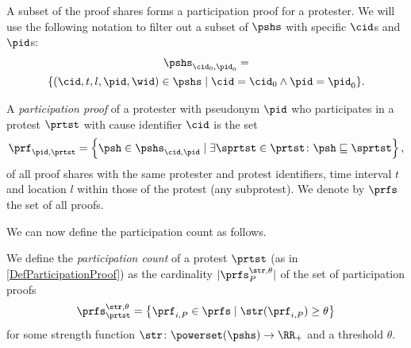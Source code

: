 A subset of the proof shares forms a participation proof for a protester.
We will use the following notation to filter out a subset of \(\pshs\) with specific \(\cid\)s and \(\pid\)s:
\begin{multline*}
  \pshs_{\cid_0, \pid_0} = \\
  \{(\cid, t, l, \pid, \wid)\in \pshs\mid \cid = \cid_0 \land \pid = \pid_0\}.
\end{multline*}

\begin{definition}%
  \label{DefParticipationProof}\label{DefParticipationProofs}
  A \emph{participation proof} of a protester with pseudonym \(\pid\) who participates in a protest \(\prtst\) with cause identifier \(\cid\) is the 
  set
  \begin{equation}
    \nonumber
    \prf_{\pid, \prtst} =
    \left\{ \psh \in \pshs_{\cid, \pid} \mid
      \exists \sprtst\in \prtst\colon \psh\sqsubseteq \sprtst \right\},
  \end{equation}
  of all proof shares with the same protester and protest identifiers, time interval \(t\) and location \(l\) within those of the protest (\ie any subprotest).
  We denote by \(\prfs\) the set of all proofs.
\end{definition}


We can now define the participation count as follows.
\begin{definition}%
  \label{DefParticipationCount}
  We define the \emph{participation count} of a protest \(\prtst\) (as in \cref{DefParticipationProof}) as the cardinality 
  \(|\prfs_{P}^{\str,\theta}|\) of the set of participation proofs \[
    \prfs_{\prtst}^{\str,\theta} = \left\{ \prf_{i,P} \in \prfs \mid
      \str(\prf_{i,P})\geq \theta \right\}
  \] for some strength function \(\str\colon \powerset(\pshs)\to \RR_+\) and a 
  threshold \(\theta\).
\end{definition}


